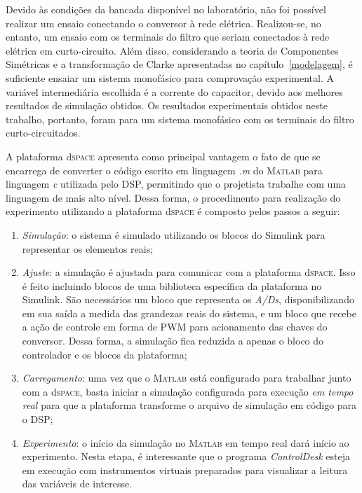   Devido às condições da bancada disponível no laboratório, não foi possível realizar um ensaio conectando o conversor à rede elétrica. Realizou-se, no entanto, um ensaio com os terminais do filtro que seriam conectados à rede elétrica em curto-circuito. Além disso, considerando a teoria de Componentes Simétricas e a transformação de Clarke apresentadas no capítulo~\ref{modelagem}, é suficiente ensaiar um sistema monofásico para comprovação experimental. A variável intermediária escolhida é a corrente do capacitor, devido aos melhores resultados de simulação obtidos. Os resultados experimentais obtidos neste trabalho, portanto, foram para um sistema monofásico com os terminais do filtro curto-circuitados.

  A plataforma d\textsc{space} apresenta como principal vantagem o fato de que se encarrega de converter o código escrito em linguagem \emph{.m} do \textsc{Matlab} para linguagem \emph{c} utilizada pelo DSP, permitindo que o projetista trabalhe com uma linguagem de mais alto nível. Dessa forma, o procedimento para realização do experimento utilizando a plataforma d\textsc{space} é composto pelos passos a seguir:
  \begin{enumerate}
    \item \textit{Simulação}: o sistema é simulado utilizando os blocos do Simulink para representar os elementos reais;
    \item \textit{Ajuste}: a simulação é ajustada para comunicar com a plataforma d\textsc{space}. Isso é feito incluindo blocos de uma biblioteca específica da plataforma no Simulink. São necessários um bloco que representa os \emph{A/Ds}, disponibilizando em sua saída a medida das grandezas reais do sistema, e um bloco que recebe a ação de controle em forma de PWM para acionamento das chaves do conversor. Dessa forma, a simulação fica reduzida a apenas o bloco do controlador e os blocos da plataforma;
    \item \textit{Carregamento}: uma vez que o \textsc{Matlab} está configurado para trabalhar junto com a d\textsc{space}, basta iniciar a simulação configurada para execução \emph{em tempo real} para que a plataforma transforme o arquivo de simulação em código para o DSP;
    \item \textit{Experimento}: o início da simulação no \textsc{Matlab} em tempo real dará início ao experimento. Nesta etapa, é interessante que o programa \emph{ControlDesk} esteja em execução com instrumentos virtuais preparados para visualizar a leitura das variáveis de interesse.
  \end{enumerate}

